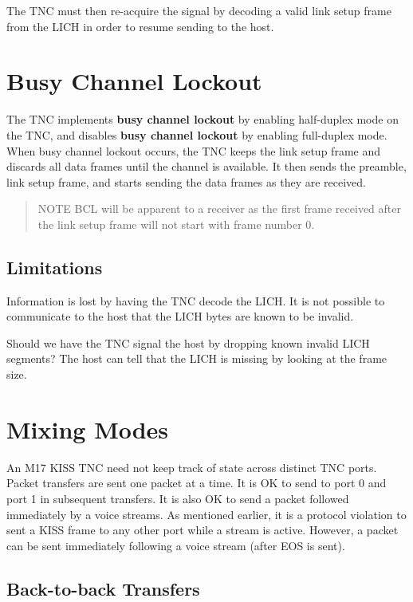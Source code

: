 \documentclass[a4paper,11pt,oneside]{book}
\begin{document}
The TNC must then re-acquire the signal by decoding a valid link setup frame from the LICH in order to resume sending to the host.

\section{Busy Channel Lockout}

The TNC implements \textbf{busy channel lockout} by enabling half-duplex mode on the TNC, and disables \textbf{busy channel lockout} by enabling full-duplex mode. When busy channel lockout occurs, the TNC keeps the link setup frame and discards all data frames until the channel is available. It then sends the preamble, link setup frame, and starts sending the data frames as they are received.

\begin{quote}
	NOTE BCL will be apparent to a receiver as the first frame received after the link setup frame will not start with frame number 0.
\end{quote}

\subsection{Limitations}

Information is lost by having the TNC decode the LICH. It is not possible to communicate to the host that the LICH bytes are known to be invalid.

Should we have the TNC signal the host by dropping known invalid LICH segments? The host can tell that the LICH is missing by looking at the frame size.

\section{Mixing Modes}

An M17 KISS TNC need not keep track of state across distinct TNC ports. Packet transfers are sent one packet at a time. It is OK to send to port 0 and port 1 in subsequent transfers. It is also OK to send a packet followed immediately by a voice streams. As mentioned earlier, it is a protocol violation to sent a KISS frame to any other port while a stream is active. However, a packet can be sent immediately following a voice stream (after EOS is sent).

\subsection{Back-to-back Transfers}
\end{document}
